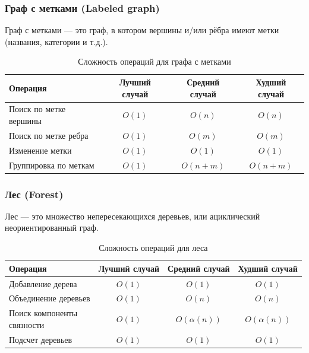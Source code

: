 \documentclass[a4paper,12pt]{article}
\begin{document}
\subsubsection{Граф с метками (Labeled graph)}
\label{subsubsec:граф-с-метками-labeled-graph}

Граф с метками --- это граф, в котором вершины и/или рёбра имеют метки (названия, категории и т.д.).

\begin{table}[H]
    \centering
    \begin{tabular}{|l|c|c|c|}
        \hline
        Операция & Лучший случай & Средний случай & Худший случай \\
        \hline
        Поиск по метке вершины & $O(1)$ & $O(n)$ & $O(n)$ \\
        \hline
        Поиск по метке ребра & $O(1)$ & $O(m)$ & $O(m)$ \\
        \hline
        Изменение метки & $O(1)$ & $O(1)$ & $O(1)$ \\
        \hline
        Группировка по меткам & $O(1)$ & $O(n + m)$ & $O(n + m)$ \\
        \hline
    \end{tabular}
    \caption{Сложность операций для графа с метками}
\end{table}

\subsubsection{Лес (Forest)}
\label{subsubsec:лес-forest}

Лес --- это множество непересекающихся деревьев, или ациклический неориентированный граф.

\begin{table}[H]
    \centering
    \begin{tabular}{|l|c|c|c|}
        \hline
        Операция & Лучший случай & Средний случай & Худший случай \\
        \hline
        Добавление дерева & $O(1)$ & $O(1)$ & $O(1)$ \\
        \hline
        Объединение деревьев & $O(1)$ & $O(n)$ & $O(n)$ \\
        \hline
        \makecell[l]{Поиск компоненты \\связности} & $O(1)$ & $O(\alpha(n))$ & $O(\alpha(n))$ \\
        \hline
        Подсчет деревьев & $O(1)$ & $O(1)$ & $O(1)$ \\
        \hline
    \end{tabular}
    \caption{Сложность операций для леса}
\end{table}
\end{document}
